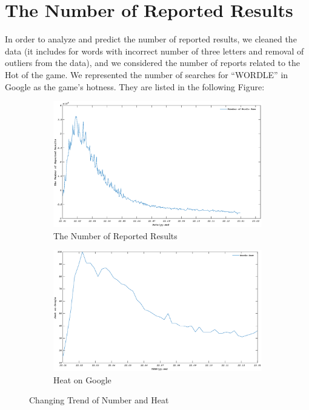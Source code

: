 \documentclass[12pt]{article}  %
\begin{document}
\section{The Number of Reported Results}
In order to analyze and predict the number of reported results, we cleaned the data (it includes for words with incorrect number of three letters and removal of outliers from the data), and we considered the number of reports related to the Hot of the game. We represented the number of searches for ``WORDLE'' in Google as the game's hotness. They are listed in the following Figure:
\begin{figure}[htbp]
\centering
\begin{subfigure}[b]{.49\textwidth}
\includegraphics[width=\textwidth]{img/yuanshi.eps}\caption{The Number of Reported Results}
\end{subfigure}
\begin{subfigure}[b]{.49\textwidth}
\includegraphics[width=\textwidth]{img/heat.eps}\caption{Heat on Google}
\end{subfigure}
\caption{Changing Trend of Number and Heat}\label{Changing Trend of Number and Heat}
\end{figure}
\end{document}
